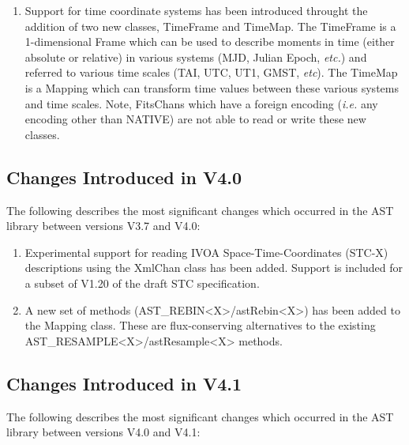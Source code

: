 \documentclass[twoside,11pt]{starlink}
\begin{document}
\begin{enumerate}

\item Support for time coordinate systems has been introduced
throught the addition of two new classes, TimeFrame and TimeMap.
The TimeFrame is a 1-dimensional Frame which can be used to describe
moments in time (either absolute or relative) in various systems (MJD,
Julian Epoch, \emph{etc.}) and referred to various time scales (TAI, UTC,
UT1, GMST, \emph{etc}). The TimeMap is a Mapping which can transform time
values between these various systems and time scales. Note,
FitsChans which have a foreign encoding (\emph{i.e.} any encoding other
than NATIVE) are not able to read or write these new classes.

\end{enumerate}


\subsection{Changes Introduced in V4.0}

The following describes the most significant changes which
occurred in the AST library between versions V3.7 and V4.0:

\begin{enumerate}

\item Experimental support for reading IVOA Space-Time-Coordinates (STC-X)
descriptions using the XmlChan class has been added. Support is included
for a subset of V1.20 of the draft STC specification.

\item A new set of methods (AST\_REBIN<X>/astRebin<X>) has been added to
the Mapping class. These are flux-conserving alternatives to the existing
AST\_RESAMPLE<X>/astResample<X> methods.

\end{enumerate}


\subsection{Changes Introduced in V4.1}

The following describes the most significant changes which
occurred in the AST library between versions V4.0 and V4.1:
\end{document}
